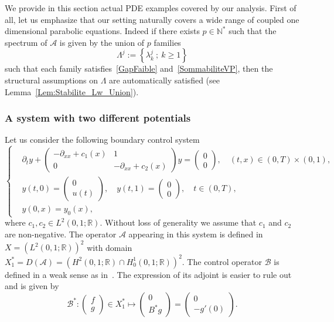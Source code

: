\documentclass[11pt]{article}
\theoremstyle{definition}
\numberwithin{equation}{section}
\numberwithin{figure}{section}
\numberwithin{table}{section}
\newcommand\A{\mathcal{A}}
\newcommand\B{\mathcal{B}}
\newcommand\Bs{\mathcal{B}^*}
\newcommand{\Xuns}{X_1^*}
\newcommand{\N}{\mathbb{N}}
\newcommand{\R}{\mathbb{R}}
\begin{document}
We provide in this section actual PDE examples covered by our analysis. First of all, let us emphasize that our setting naturally covers a wide range of coupled one dimensional parabolic equations. Indeed if there exists $p \in \N^*$ such that the spectrum of $\A$ is given by the union of $p$ families
\[
\Lambda^j := \left\{ \lambda_k^j \: ; \: k \geq 1 \right\}
\]
such that each family satisfies~\eqref{GapFaible} and~\eqref{SommabiliteVP}, then the structural assumptions on $\Lambda$ are automatically satisfied (see Lemma~\ref{Lem:Stabilite_Lw_Union}).



\subsubsection{A system with two different potentials} \label{sec_two_potentials}
Let us consider the following boundary control system
\begin{equation}\label{systeme_en_c}
\begin{cases}
& \partial_t y +
\begin{pmatrix} - \partial_{xx} + c_1(x) & 1 \\ 0 & -\partial_{xx} + c_2(x)
\end{pmatrix} y =
\begin{pmatrix} 0 \\ 0
\end{pmatrix},
\quad (t,x) \in (0,T) \times (0,1),
\\[0.15em] 
&y(t,0) =
\begin{pmatrix} 0 \\ u(t)
\end{pmatrix}, \quad y(t,1) =
\begin{pmatrix} 0 \\ 0
\end{pmatrix}, \quad t\in (0,T),
\\[0.15em] 
&y(0,x) = y_0(x),
\end{cases}
\end{equation}
where $c_1,c_2\in L^2(0,1;\R)$. Without loss of generality we assume that $c_1$ and $c_2$ are non-negative. The operator $\A$ appearing in this system is defined in $X=(L^2(0,1 ; \R))^2$ with domain $\Xuns=D(\A)= \left(H^2(0,1 ; \R) \cap H^1_0 (0,1 ; \R) \right)^2$. The control operator $\B$ is defined in a weak sense as in~\cite{TucsnakWeissBook}. The expression of its adjoint is easier to rule out and is given by
\[
\Bs :
\begin{pmatrix} f \\ g
\end{pmatrix} \in \Xuns \mapsto
\begin{pmatrix} 0 \\ B^* g
\end{pmatrix} =
\begin{pmatrix} 0 \\ -g'(0)
\end{pmatrix}.
\]
\end{document}
